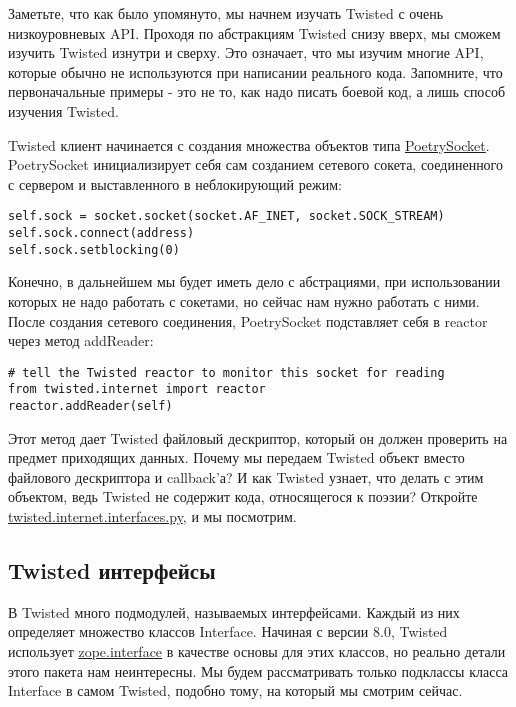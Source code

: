 Заметьте, что как было упомянуто, мы начнем изучать Twisted с 
очень низкоуровневых API. Проходя по абстракциям Twisted снизу 
вверх, мы сможем изучить Twisted изнутри и сверху. Это означает, что 
мы изучим многие API, которые обычно не используются при 
написании реального кода. Запомните, что первоначальные примеры - это не 
то, как надо писать боевой код, а лишь способ изучения Twisted.


Twisted клиент начинается с создания множества объектов типа 
\href{http://github.com/jdavisp3/twisted-intro/blob/master/twisted-client-1/get-poetry.py#L53}{PoetrySocket}. 
PoetrySocket инициализирует себя сам созданием сетевого 
сокета, соединенного с сервером и выставленного в неблокирующий режим: 

 \begin{verbatim}
self.sock = socket.socket(socket.AF_INET, socket.SOCK_STREAM)
self.sock.connect(address)
self.sock.setblocking(0)
\end{verbatim} 


Конечно, в дальнейшем мы будет иметь дело с 
абстрациями, при использовании которых не надо 
работать с сокетами, но сейчас нам нужно работать с ними. 
После создания сетевого соединения, PoetrySocket подставляет 
себя в reactor через метод addReader:

 \begin{verbatim}
# tell the Twisted reactor to monitor this socket for reading
from twisted.internet import reactor
reactor.addReader(self)
\end{verbatim} 

Этот метод дает Twisted файловый дескриптор, который он должен 
проверить на предмет приходящих данных. Почему мы передаем 
Twisted объект вместо файлового дескриптора и callback'а? 
И как Twisted узнает, что делать с этим объектом, ведь  
Twisted не содержит кода, относящегося к поэзии? Откройте 
\href{http://twistedmatrix.com/trac/browser/tags/releases/twisted-8.2.0/twisted/internet/interfaces.py}{twisted.internet.interfaces.py}, и мы посмотрим.


\subsection{Twisted интерфейсы}

В Twisted много подмодулей, называемых интерфейсами. Каждый из них 
определяет множество классов Interface. Начиная с версии 8.0, 
Twisted использует \href{http://www.zope.org/Products/ZopeInterface}{zope.interface} 
в качестве основы для этих классов, но реально детали этого пакета 
нам неинтересны. Мы будем рассматривать только подклассы класса 
Interface в самом Twisted, подобно тому, на который мы смотрим сейчас. 


